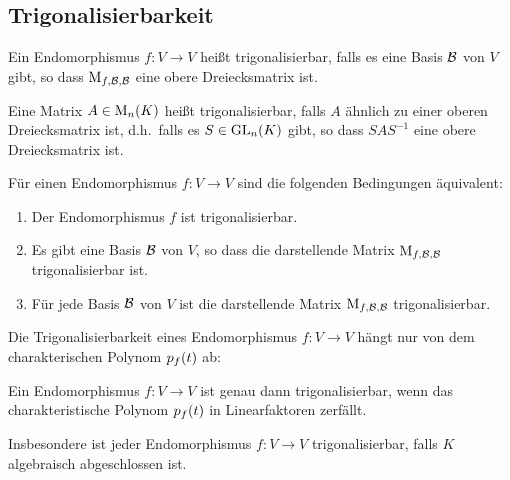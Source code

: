 





\subsection{Trigonalisierbarkeit}

\begin{definition}
  Ein Endomorphismus $f \colon V \to V$ heißt trigonalisierbar, falls es eine Basis $\mathcal{B}$ von $V$ gibt, so dass $\operatorname{M}_{f, \mathcal{B}, \mathcal{B}}$ eine obere Dreiecksmatrix ist.
  
  Eine Matrix $A \in \operatorname{M}_{n}(K)$ heißt trigonalisierbar, falls $A$ ähnlich zu einer oberen Dreiecksmatrix ist, d.h.\ falls es $S \in \operatorname{GL}_{n}(K)$ gibt, so dass $S A S^{-1}$ eine obere Dreiecksmatrix ist.
\end{definition}

\begin{lemma}
  Für einen Endomorphismus $f \colon V \to V$ sind die folgenden Bedingungen äquivalent:
  \begin{enumerate}
    \item
      Der Endomorphismus $f$ ist trigonalisierbar.
    \item
      Es gibt eine Basis $\mathcal{B}$ von $V$, so dass die darstellende Matrix $\operatorname{M}_{f, \mathcal{B}, \mathcal{B}}$ trigonalisierbar ist.
    \item
      Für jede Basis $\mathcal{B}$ von $V$ ist die darstellende Matrix $\operatorname{M}_{f, \mathcal{B}, \mathcal{B}}$ trigonalisierbar.
  \end{enumerate}
\end{lemma}

Die Trigonalisierbarkeit eines Endomorphismus $f \colon V \to V$ hängt nur von dem charakterischen Polynom $p_{f}(t)$ ab:

\begin{proposition}
  Ein Endomorphismus $f \colon V \to V$ ist genau dann trigonalisierbar, wenn das charakteristische Polynom $p_{f}(t)$ in Linearfaktoren zerfällt.
\end{proposition}

Insbesondere ist jeder Endomorphismus $f \colon V \to V$ trigonalisierbar, falls $K$ algebraisch abgeschlossen ist.





